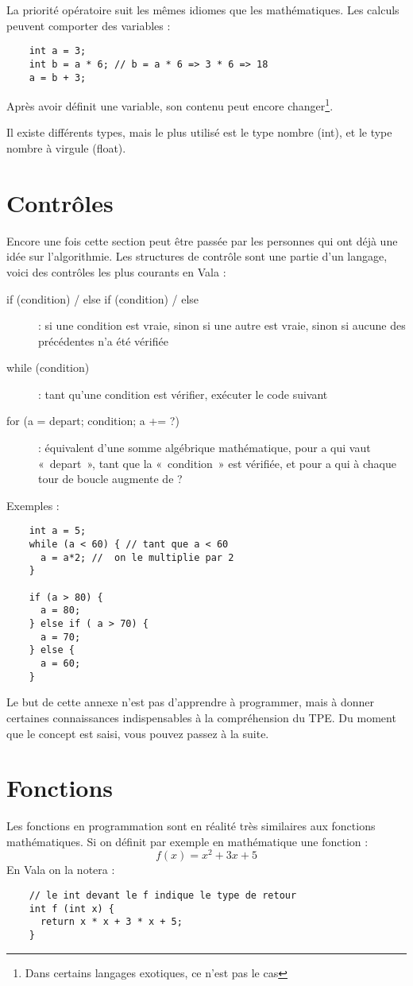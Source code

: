   La priorité opératoire suit les mêmes idiomes que les mathématiques. Les calculs peuvent comporter des variables : 
  \begin{lstlisting}
    int a = 3;
    int b = a * 6; // b = a * 6 => 3 * 6 => 18 
    a = b + 3;
  \end{lstlisting}
  
  Après avoir définit une variable, son contenu peut encore changer\footnote{Dans certains langages exotiques, ce n'est pas le cas}.

  Il existe différents types, mais le plus utilisé est le type nombre (int), et le type nombre à virgule (float).
  
\section{Contrôles}
  Encore une fois cette section peut être passée par les personnes qui ont déjà une idée sur l'algorithmie.
  Les structures de contrôle sont une partie d'un langage, voici des contrôles les plus courants en Vala :
  \begin{description}
    \item[ if (condition) / else if (condition) / else ] : si une condition est vraie, sinon si une autre est vraie, sinon si aucune des précédentes n'a été vérifiée
    \item[while (condition)] : tant qu'une condition est vérifier, exécuter le code suivant
    \item[for (a = depart; condition; a += ?)] : équivalent d'une somme algébrique mathématique, pour a qui vaut «~depart~», tant que la «~condition~» est vérifiée, et pour a qui à chaque tour de boucle augmente de ?
  \end{description}
  
  Exemples :
  \begin{lstlisting}
    int a = 5;
    while (a < 60) { // tant que a < 60
      a = a*2; //  on le multiplie par 2
    }
    
    if (a > 80) {
      a = 80;
    } else if ( a > 70) {
      a = 70;
    } else {
      a = 60;
    }
  \end{lstlisting}
  
  Le but de cette annexe n'est pas d'apprendre à programmer, mais à donner certaines connaissances indispensables à la compréhension du TPE. Du moment que le concept est saisi, vous pouvez passez à la suite.

\section{Fonctions}
  Les fonctions en programmation sont en réalité très similaires aux fonctions mathématiques. Si on définit par exemple en mathématique une fonction : 
  \[ f(x) = x^2 + 3x + 5 \]
  En Vala on la notera :
  \begin{lstlisting}
    // le int devant le f indique le type de retour
    int f (int x) {
      return x * x + 3 * x + 5;
    }
  \end{lstlisting}
  
